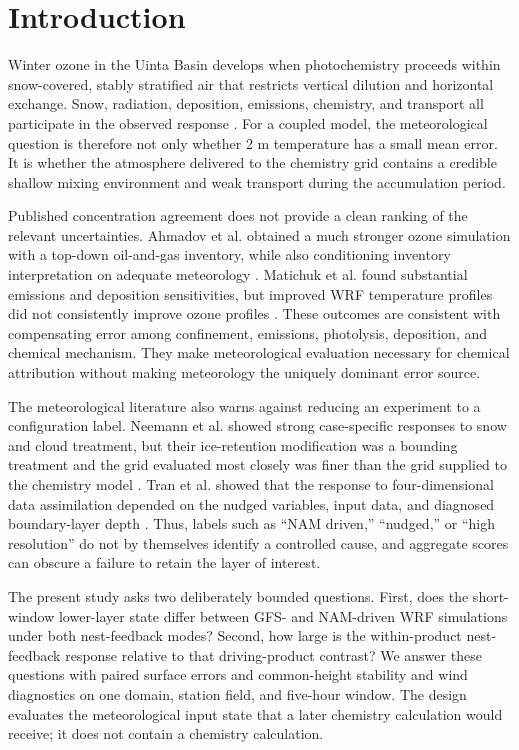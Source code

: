 \documentclass[air,article,submit,moreauthors]{Definitions/mdpi}
\begin{document}
\section{Introduction}

Winter ozone in the Uinta Basin develops when photochemistry proceeds within snow-covered, stably stratified air that restricts vertical dilution and horizontal exchange.
Snow, radiation, deposition, emissions, chemistry, and transport all participate in the observed response \citep{Ahmadov2015-zm,Neemann2015-ws,Davies2025-wy}.
For a coupled model, the meteorological question is therefore not only whether 2 m temperature has a small mean error.
It is whether the atmosphere delivered to the chemistry grid contains a credible shallow mixing environment and weak transport during the accumulation period.

Published concentration agreement does not provide a clean ranking of the relevant uncertainties.
Ahmadov et al. obtained a much stronger ozone simulation with a top-down oil-and-gas inventory, while also conditioning inventory interpretation on adequate meteorology \citep{Ahmadov2015-zm}.
Matichuk et al. found substantial emissions and deposition sensitivities, but improved WRF temperature profiles did not consistently improve ozone profiles \citep{Matichuk2017-bq}.
These outcomes are consistent with compensating error among confinement, emissions, photolysis, deposition, and chemical mechanism.
They make meteorological evaluation necessary for chemical attribution without making meteorology the uniquely dominant error source.

The meteorological literature also warns against reducing an experiment to a configuration label.
Neemann et al. showed strong case-specific responses to snow and cloud treatment, but their ice-retention modification was a bounding treatment and the grid evaluated most closely was finer than the grid supplied to the chemistry model \citep{Neemann2015-ws}.
Tran et al. showed that the response to four-dimensional data assimilation depended on the nudged variables, input data, and diagnosed boundary-layer depth \citep{Tran2018-cx}.
Thus, labels such as ``NAM driven,'' ``nudged,'' or ``high resolution'' do not by themselves identify a controlled cause, and aggregate scores can obscure a failure to retain the layer of interest.

The present study asks two deliberately bounded questions.
First, does the short-window lower-layer state differ between GFS- and NAM-driven WRF simulations under both nest-feedback modes?
Second, how large is the within-product nest-feedback response relative to that driving-product contrast?
We answer these questions with paired surface errors and common-height stability and wind diagnostics on one domain, station field, and five-hour window.
The design evaluates the meteorological input state that a later chemistry calculation would receive; it does not contain a chemistry calculation.
\end{document}
